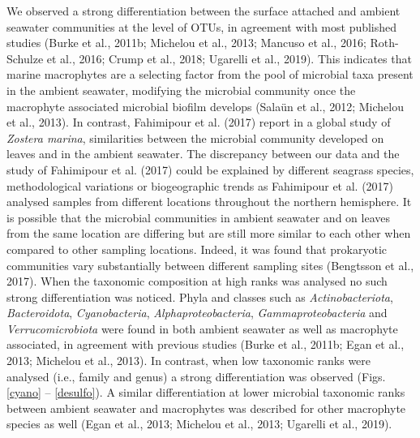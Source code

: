 \documentclass[
  12pt,
]{article}
\begin{document}
We observed a strong differentiation between the surface attached and
ambient seawater communities at the level of OTUs, in agreement with
most published studies (Burke et al., 2011b; Michelou et al., 2013;
Mancuso et al., 2016; Roth-Schulze et al., 2016; Crump et al., 2018;
Ugarelli et al., 2019). This indicates that marine macrophytes are a
selecting factor from the pool of microbial taxa present in the ambient
seawater, modifying the microbial community once the macrophyte
associated microbial biofilm develops (Salaün et al., 2012; Michelou et
al., 2013). In contrast, Fahimipour et al. (2017) report in a global
study of \emph{Zostera marina}, similarities between the microbial
community developed on leaves and in the ambient seawater. The
discrepancy between our data and the study of Fahimipour et al. (2017)
could be explained by different seagrass species, methodological
variations or biogeographic trends as Fahimipour et al. (2017) analysed
samples from different locations throughout the northern hemisphere. It
is possible that the microbial communities in ambient seawater and on
leaves from the same location are differing but are still more similar
to each other when compared to other sampling locations. Indeed, it was
found that prokaryotic communities vary substantially between different
sampling sites (Bengtsson et al., 2017). When the taxonomic composition
at high ranks was analysed no such strong differentiation was noticed.
Phyla and classes such as \emph{Actinobacteriota}, \emph{Bacteroidota},
\emph{Cyanobacteria}, \emph{Alphaproteobacteria},
\emph{Gammaproteobacteria} and \emph{Verrucomicrobiota} were found in
both ambient seawater as well as macrophyte associated, in agreement
with previous studies (Burke et al., 2011b; Egan et al., 2013; Michelou
et al., 2013). In contrast, when low taxonomic ranks were analysed
(i.e., family and genus) a strong differentiation was observed (Figs.
\ref{cyano} -- \ref{desulfo}). A similar differentiation at lower
microbial taxonomic ranks between ambient seawater and macrophytes was
described for other macrophyte species as well (Egan et al., 2013;
Michelou et al., 2013; Ugarelli et al., 2019).
\end{document}
